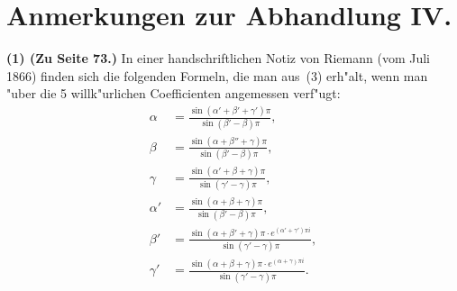 \documentclass[12pt,a4paper]{book}
\theoremstyle{definition}
\theoremstyle{remark}
\begin{document}
\newpage
\section*{Anmerkungen zur Abhandlung IV.}
\label{sec:anmerkungen}

\textbf{(1) (Zu Seite 73.)} In einer handschriftlichen Notiz von Riemann
(vom Juli 1866) finden sich die folgenden Formeln, die man aus~(3) erh"alt,
wenn man "uber die 5 willk"urlichen Coefficienten angemessen verf"ugt:
\[
\begin{aligned}
\alpha &= \frac{\sin(\alpha'+\beta'+\gamma')\pi}{\sin(\beta'-\beta)\pi},\\
\beta &= \frac{\sin(\alpha+\beta''+\gamma)\pi}{\sin(\beta'-\beta)\pi},\\
\gamma &= \frac{\sin(\alpha'+\beta+\gamma)\pi}{\sin(\gamma'-\gamma)\pi},\\
\alpha' &= \frac{\sin(\alpha+\beta+\gamma)\pi}{\sin(\beta'-\beta)\pi},\\
\beta' &= \frac{\sin(\alpha+\beta'+\gamma)\pi \cdot e^{(\alpha'+\gamma')\pi i}}{\sin(\gamma'-\gamma)\pi},\\
\gamma' &= \frac{\sin(\alpha+\beta+\gamma)\pi \cdot e^{(\alpha+\gamma)\pi i}}{\sin(\gamma'-\gamma)\pi}.
\end{aligned}
\]
\end{document}
